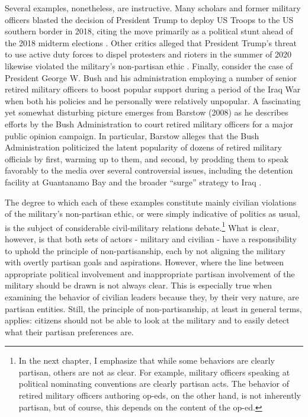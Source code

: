 \documentclass[
  12pt,
  oneside]{memoir}
\begin{document}
Several examples, nonetheless, are instructive. Many scholars and former military officers blasted the decision of President Trump to deploy US Troops to the US southern border in 2018, citing the move primarily as a political stunt ahead of the 2018 midterm elections \autocite{adams_trumps_2018}. Other critics alleged that President Trump's threat to use active duty forces to dispel protesters and rioters in the summer of 2020 likewise violated the military's non-partisan ethic \autocite{brooks_dismay_2020}. Finally, consider the case of President George W. Bush and his administration employing a number of senior retired military officers to boost popular support during a period of the Iraq War when both his policies and he personally were relatively unpopular. A fascinating yet somewhat disturbing picture emerges from Barstow (2008) as he describes efforts by the Bush Administration to court retired military officers for a major public opinion campaign. In particular, Barstow alleges that the Bush Administration politicized the latent popularity of dozens of retired military officials by first, warming up to them, and second, by prodding them to speak favorably to the media over several controversial issues, including the detention facility at Guantanamo Bay and the broader ``surge'' strategy to Iraq \autocite{barstow_behind_2008}.

The degree to which each of these examples constitute mainly civilian violations of the military's non-partisan ethic, or were simply indicative of politics as usual, is the subject of considerable civil-military relations debate.\footnote{In the next chapter, I emphasize that while some behaviors are clearly partisan, others are not as clear. For example, military officers speaking at political nominating conventions are clearly partisan acts. The behavior of retired military officers authoring op-eds, on the other hand, is not inherently partisan, but of course, this depends on the content of the op-ed.} What is clear, however, is that both sets of actors - military and civilian - have a responsibility to uphold the principle of non-partisanship, each by not aligning the military with overtly partisan goals and aspirations. However, where the line between appropriate political involvement and inappropriate partisan involvement of the military should be drawn is not always clear. This is especially true when examining the behavior of civilian leaders because they, by their very nature, are partisan entities. Still, the principle of non-partisanship, at least in general terms, applies: citizens should not be able to look at the military and to easily detect what their partisan preferences are.
\end{document}
